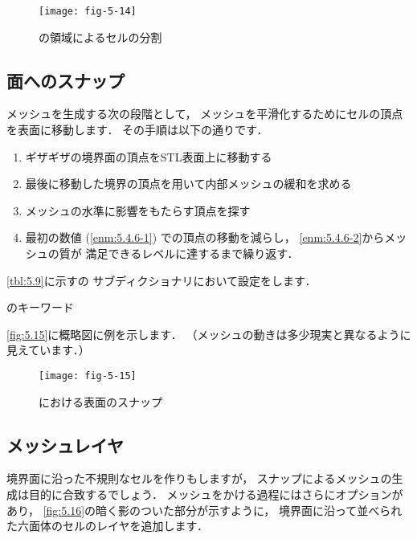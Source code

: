 \begin{figure}[ht]
 \texttt{[image: fig-5-14]}
 \caption{の領域によるセルの分割}
 \label{fig:5.14}
\end{figure}


\subsection{面へのスナップ}
\label{ssec:5.4.6}
%
メッシュを生成する次の段階として，
メッシュを平滑化するためにセルの頂点を表面に移動します．
その手順は以下の通りです．
\begin{enumerate}
 \item\label{enm:5.4.6-1}
      ギザギザの境界面の頂点をSTL表面上に移動する
 \item\label{enm:5.4.6-2}
      最後に移動した境界の頂点を用いて内部メッシュの緩和を求める
 \item メッシュの水準に影響をもたらす頂点を探す
 \item 最初の数値 (\ref{enm:5.4.6-1}) での頂点の移動を減らし，
       \ref{enm:5.4.6-2}からメッシュの質が
       満足できるレベルに達するまで繰り返す．
\end{enumerate}
\autoref{tbl:5.9}に示すの
サブディクショナリにおいて設定をします．


\begin{table}[ht]
 
 \caption{のキーワード}
 \label{tbl:5.9}
\end{table}


\autoref{fig:5.15}に概略図に例を示します．
（メッシュの動きは多少現実と異なるように見えています．）


\begin{figure}[ht]
 \texttt{[image: fig-5-15]}
 \caption{における表面のスナップ}
 \label{fig:5.15}
\end{figure}


\subsection{メッシュレイヤ}
\label{ssec:5.4.7}
%
境界面に沿った不規則なセルを作りもしますが，
スナップによるメッシュの生成は目的に合致するでしょう．
メッシュをかける過程にはさらにオプションがあり，
\autoref{fig:5.16}の暗く影のついた部分が示すように，
境界面に沿って並べられた六面体のセルのレイヤを追加します．


